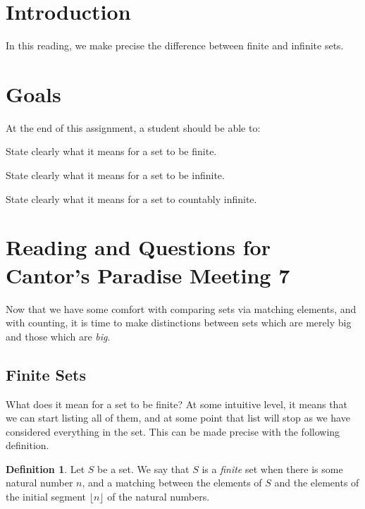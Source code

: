 \documentclass[12pt,letterpaper]{article}
\theoremstyle{definition}
\newtheorem*{definition}{Definition}
\begin{document}
\setlength{\parskip}{1ex plus 0.5ex minus 0.2ex}
\setlength{\parindent}{0pt}

\pagestyle{fancy}
\cfoot{}

\section*{Introduction}
In this reading, we make precise the difference between finite and infinite sets.

\section*{Goals}
At the end of this assignment, a student should be able to:
\begin{compactitem}
\item State clearly what it means for a set to be finite.
\item State clearly what it means for a set to be infinite.
\item State clearly what it means for a set to countably infinite.
\end{compactitem}


\section*{Reading and Questions for Cantor's Paradise Meeting 7}

Now that we have some comfort with comparing sets via matching elements, and with counting, it is time to make distinctions between sets which are merely big and those which are \emph{big}.

\subsection*{Finite Sets}

What does it mean for a set to be finite?
At some intuitive level, it means that we can start listing all of them, and at some point that list will stop as we have considered everything in the set. 
This can be made precise with the following definition.
\begin{definition}
Let $S$ be a set. We say that $S$ is a \emph{finite} set when there is some natural number $n$, and a matching between the elements of $S$ and the elements of the initial segment $\lfloor n \rfloor$ of the natural numbers.
\end{definition}
\end{document}
